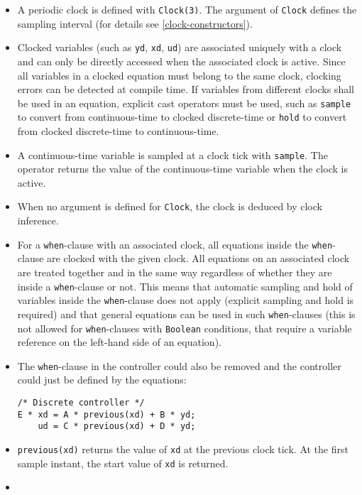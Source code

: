 \begin{itemize}
\item
  A periodic clock is defined with \lstinline!Clock(3)!.
  The argument of \lstinline!Clock! defines the sampling interval (for details see \cref{clock-constructors}).
\item
  Clocked variables (such as \lstinline!yd!, \lstinline!xd!, \lstinline!ud!) are associated uniquely with a clock and can only be directly accessed when the associated clock is active.
  Since all variables in a clocked equation must belong to the same clock, clocking errors can be detected at compile time.
  If variables from different clocks shall be used in an equation, explicit cast operators must be used, such as \lstinline!sample! to convert from continuous-time to clocked discrete-time or \lstinline!hold! to convert from clocked discrete-time to continuous-time.
\item
  A continuous-time variable is sampled at a clock tick with \lstinline!sample!.
  The operator returns the value of the continuous-time variable when the clock is active.
\item
  When no argument is defined for \lstinline!Clock!, the clock is deduced by clock inference.
\item
  For a \lstinline!when!-clause with an associated clock, all equations inside the \lstinline!when!-clause are clocked with the given clock.
  All equations on an associated clock are treated together and in the same way regardless of whether they are inside a \lstinline!when!-clause or not.
  This means that automatic sampling and hold of variables inside the \lstinline!when!-clause does not apply (explicit sampling and hold is required) and that general equations can be used in such \lstinline!when!-clauses (this is not allowed for \lstinline!when!-clauses with \lstinline!Boolean! conditions, that require a variable reference on the left-hand side of an equation).
\item
  The \lstinline!when!-clause in the controller could also be removed
  and the controller could just be defined by the equations:
\begin{lstlisting}[language=modelica]
/* Discrete controller */
E * xd = A * previous(xd) + B * yd;
    ud = C * previous(xd) + D * yd;
\end{lstlisting}
\item
  \lstinline!previous(xd)! returns the value of \lstinline!xd! at the previous clock tick.
  At the first sample instant, the start value of \lstinline!xd! is returned.
\item

\end{itemize}

